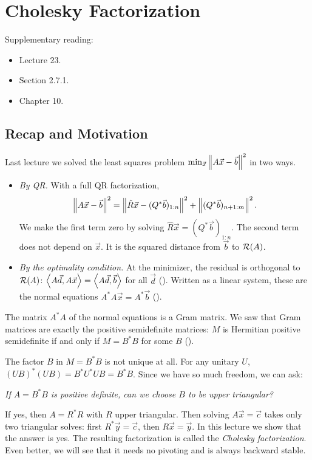 \chapter{Cholesky Factorization}
\label{ch:cholesky}

Supplementary reading:
\begin{itemize}
  \item \cite{TB} Lecture 23.
  \item \cite{Demmel} Section 2.7.1.
  \item \cite{Higham} Chapter 10.
\end{itemize}

\section{Recap and Motivation}

Last lecture we solved the least squares problem $\min_{\vec{x}}\left\lVert A\vec{x} - \vec{b} \right\rVert^2$ in two ways.
\begin{itemize}
  \item \emph{By QR.} With a full QR factorization,
  \begin{equation*}
    \left\lVert A\vec{x} - \vec{b} \right\rVert^2 = \left\lVert \hat{R}\vec{x} - (Q^\ast\vec{b})_{1:n} \right\rVert^2 + \left\lVert (Q^\ast\vec{b})_{n+1:m} \right\rVert^2.
  \end{equation*}
  We make the first term zero by solving $\hat{R}\vec{x} = (Q^\ast\vec{b})_{1:n}$. The second term does not depend on $\vec{x}$. It is the squared distance from $\vec{b}$ to $\mathcal{R}(A)$.
  \item \emph{By the optimality condition.} At the minimizer, the residual is orthogonal to $\mathcal{R}(A)$: $\left\langle A\vec{d}, A\vec{x} \right\rangle = \left\langle A\vec{d}, \vec{b} \right\rangle$ for all $\vec{d}$ (). Written as a linear system, these are the normal equations $A^\ast A\vec{x} = A^\ast\vec{b}$ ().
\end{itemize}
The matrix $A^\ast A$ of the normal equations is a Gram matrix. We saw that Gram matrices are exactly the positive semidefinite matrices: $M$ is Hermitian positive semidefinite if and only if $M = B^\ast B$ for some $B$ ().

The factor $B$ in $M = B^\ast B$ is not unique at all. For any unitary $U$, $(UB)^\ast(UB) = B^\ast U^\ast UB = B^\ast B$. Since we have so much freedom, we can ask:
\begin{center}
  \emph{If $A = B^\ast B$ is positive definite, can we choose $B$ to be upper triangular?}
\end{center}
If yes, then $A = R^\ast R$ with $R$ upper triangular. Then solving $A\vec{x} = \vec{c}$ takes only two triangular solves: first $R^\ast\vec{y} = \vec{c}$, then $R\vec{x} = \vec{y}$. In this lecture we show that the answer is yes. The resulting factorization is called the \emph{Cholesky factorization}. Even better, we will see that it needs no pivoting and is always backward stable.

